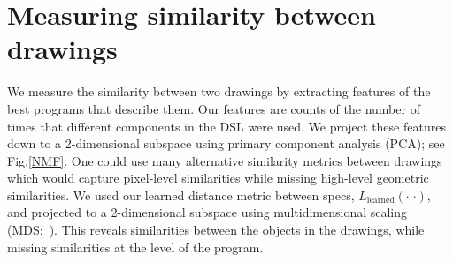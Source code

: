 \documentclass{article}
\begin{document}
\section{Measuring similarity between drawings}

We measure the similarity between two drawings by extracting features
of the best programs that describe them. Our features are counts of the number of times that different components in the
DSL were used.  We project these features down to a
2-dimensional subspace using primary component analysis
(PCA); see Fig.\ref{NMF}.  One could use many
alternative similarity metrics between drawings which would capture pixel-level similarities while missing high-level geometric similarities.
We used our learned distance metric between specs, $L_{\text{learned}}(\cdot|\cdot)$, and projected to a 2-dimensional subspace using multidimensional scaling (MDS:~\cite{cox2008multidimensional}). This reveals similarities between the objects in the drawings,
while missing similarities at the level of the program.
\end{document}
